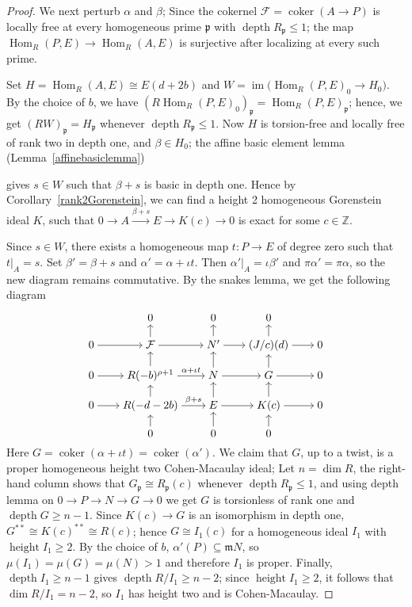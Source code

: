 \documentclass[11pt,letterpaper]{amsart}
\newcommand{\x}{\xrightarrow{}}
\DeclareMathOperator{\h}{Hom}
\DeclareMathOperator{\dep}{depth}
\DeclareMathOperator{\img}{im}
\DeclareMathOperator{\depth}{depth}
\DeclareMathOperator{\height}{height}
\theoremstyle{plain}
\theoremstyle{definition}
\theoremstyle{remark}
\begin{document}
\begin{proof}
We next perturb \(\alpha\) and \(\beta\); Since the cokernel \(\mathcal{F}=\operatorname{coker}(A\to P)\) is locally free at every homogeneous prime \(\mathfrak p\) with \(\depth R_\mathfrak p\leq1\); the map $
\operatorname{Hom}_R(P,E)\longrightarrow \operatorname{Hom}_R(A,E)$ 
is surjective after localizing at every such prime. 

Set $H=\h_R(A,E)\cong E(d+2b)$ and
$W=\img\big(\h_R(P,E)_0\to H_0\big)$. By the choice of $b$, we have
$(R\h_R(P,E)_0)_{\mathfrak p}=\h_R(P,E)_{\mathfrak p}$; hence, we get $(RW)_{\mathfrak p}=H_{\mathfrak p}$ whenever $\dep R_{\mathfrak p}\leq1$.
Now $H$ is torsion-free and locally free of rank two in depth one, and $\beta\in H_0$; the affine basic element lemma (Lemma~\ref{affinebasiclemma})

gives $s\in W$ such that $\beta+s$ is basic in depth one. Hence by Corollary~\ref{rank2Gorenstein}, we can find a height 2 homogeneous Gorenstein ideal $K$, such that $0\x A\xrightarrow{\beta+s}E\x K(c)\x 0$ is exact for some $c\in\mathbb Z$. 

Since $s\in W$, there exists a homogeneous map $t:P\to E$ of degree zero such that
$t|_A=s$. Set $\beta'=\beta+s$ and $\alpha'=\alpha+\iota t$. Then $\alpha'|_A=\iota\beta'$ and
$\pi\alpha'=\pi\alpha$, so the new diagram remains commutative. By the snakes lemma, we get the following diagram

\[
\begin{tikzcd}[row sep=1.1em, column sep=2em, cramped]
  & 0 & 0 & 0 \\
0 \arrow[r]
  & \mathcal F \arrow[u] \arrow[r]
  & N' \arrow[u] \arrow[r]
  & (J/c)(d) \arrow[u] \arrow[r] & 0 \\
0 \arrow[r]
  & R(-b)^{\rho+1} \arrow[u] \arrow[r,"\alpha+\iota t"]
  & N \arrow[u] \arrow[r]
  & G \arrow[u] \arrow[r] & 0 \\
0 \arrow[r]
  & R(-d-2b) \arrow[u] \arrow[r,"\beta+s"]
  & E \arrow[u] \arrow[r]
  & K(c) \arrow[u] \arrow[r] & 0 \\
  & 0 \arrow[u]
  & 0 \arrow[u]
  & 0 \arrow[u]
\end{tikzcd}
\]
Here \(G=\operatorname{coker}(\alpha+\iota t)=\operatorname{coker}(\alpha')\). We claim that \(G\), up to a twist, is a proper homogeneous height two Cohen-Macaulay ideal;
Let $n=\dim R$, the right-hand column shows that $G_{\mathfrak p}\cong
R_{\mathfrak p}(c)$ whenever $\depth R_{\mathfrak p}\leq1$, and using depth lemma on
$0\to P\to N\to G\to0$ we get $G$ is
torsionless of rank one and $\depth G\geq n-1$. Since $K(c)\to G$ is an
isomorphism in depth one, $G^{**}\cong K(c)^{**}\cong R(c)$; hence
$G\cong I_1(c)$ for a homogeneous ideal $I_1$ with $\height I_1\geq2$.
By the choice of $b$, $\alpha'(P)\subseteq\mathfrak mN$, so
$\mu(I_1)=\mu(G)=\mu(N)>1$ and therefore $I_1$ is proper. Finally,
$\depth I_1\geq n-1$ gives $\depth R/I_1\geq n-2$; since
$\height I_1\geq2$, it follows that $\dim R/I_1=n-2$, so $I_1$ has height
two and is Cohen-Macaulay.


\end{proof}
\end{document}

